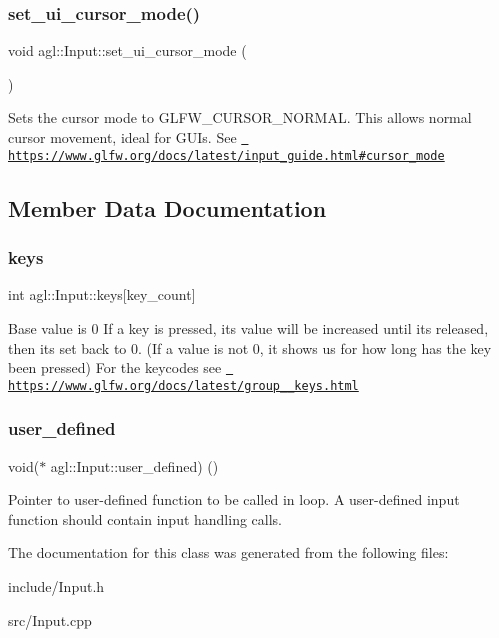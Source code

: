 \subsubsection{\texorpdfstring{set\_ui\_cursor\_mode()}{set\_ui\_cursor\_mode()}}
{\footnotesize\ttfamily void agl\+::\+Input\+::set\+\_\+ui\+\_\+cursor\+\_\+mode (\begin{DoxyParamCaption}{ }\end{DoxyParamCaption})}

Sets the cursor mode to G\+L\+F\+W\+\_\+\+C\+U\+R\+S\+O\+R\+\_\+\+N\+O\+R\+M\+AL. This allows normal cursor movement, ideal for G\+U\+Is. See \href{https://www.glfw.org/docs/latest/input_guide.html\#cursor_mode}{\texttt{ https\+://www.\+glfw.\+org/docs/latest/input\+\_\+guide.\+html\#cursor\+\_\+mode}} 

\subsection{Member Data Documentation}
\mbox{\label{classagl_1_1Input_a3d527e17ed44a940216ab7bd721b00a6}} 
\subsubsection{\texorpdfstring{keys}{keys}}
{\footnotesize\ttfamily int agl\+::\+Input\+::keys\mbox{[}key\+\_\+count\mbox{]}\hspace{0.3cm}{\ttfamily [private]}}

Base value is 0 If a key is pressed, it\textquotesingle{}s value will be increased until it\textquotesingle{}s released, then it\textquotesingle{}s set back to 0. (If a value is not 0, it shows us for how long has the key been pressed) For the keycodes see \href{https://www.glfw.org/docs/latest/group__keys.html}{\texttt{ https\+://www.\+glfw.\+org/docs/latest/group\+\_\+\+\_\+keys.\+html}} \mbox{\label{classagl_1_1Input_a51bd4ac4cca730989ceef176786c9c38}} 
\subsubsection{\texorpdfstring{user\_defined}{user\_defined}}
{\footnotesize\ttfamily void($\ast$ agl\+::\+Input\+::user\+\_\+defined) ()\hspace{0.3cm}{\ttfamily [private]}}

Pointer to user-\/defined function to be called in loop. A user-\/defined input function should contain input handling calls. 

The documentation for this class was generated from the following files\+:\begin{DoxyCompactItemize}
\item 
include/Input.\+h\item 
src/Input.\+cpp\end{DoxyCompactItemize}
